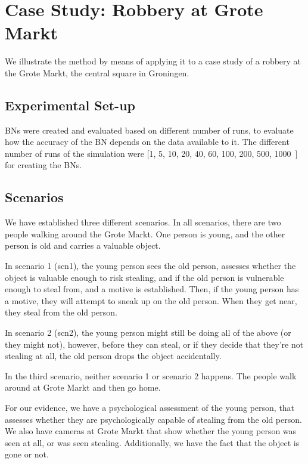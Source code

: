 \documentclass[11pt]{article}
\begin{document}
\newpage


\section{Case Study: Robbery at Grote Markt}
We illustrate the method by means of applying it to a case study of a robbery at the Grote Markt, the central square in Groningen.

\subsection{Experimental Set-up}
BNs were created and evaluated based on different number of runs, to evaluate how the accuracy of the BN depends on the data available to it. The different number of runs of the simulation were [1, 5, 10, 20, 40, 60, 100, 200, 500, 1000~] for creating the BNs.

\subsection{Scenarios}


We have established three different scenarios. In all scenarios, there are two people walking around the Grote Markt. One person is young, and the other person is old and carries a valuable object. 

In scenario 1 (scn1), the young person sees the old person, assesses whether the object is valuable enough to risk stealing, and if the old person is vulnerable enough to steal from, and a motive is established. Then, if the young person has a motive, they will attempt to sneak up on the old person. When they get near, they steal from the old person.

In scenario 2 (scn2), the young person might still be doing all of the above (or they might not), however, before they can steal, or if they decide that they're not stealing at all, the old person drops the object accidentally.

In the third scenario, neither scenario 1 or scenario 2 happens. The people walk around at Grote Markt and then go home.

For our evidence, we have a psychological assessment of the young person, that assesses whether they are psychologically capable of stealing from the old person. We also have cameras at Grote Markt that show whether the young person was seen at all, or was seen stealing. Additionally, we have the fact that the object is gone or not.
\end{document}
